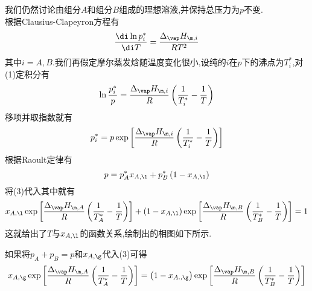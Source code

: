 \documentclass{ctexart}
\begin{document}
\begin{derivation}\setcounter{equation}{0}
    我们仍然讨论由组分$A$和组分$B$组成的理想溶液,并保持总压力为$p$不变.\\
    根据Clausius-Clapeyron方程有
    \begin{equation}
        \dfrac{\di\ln p_{i}^\ast}{\di T}=\dfrac{\Delta_\vap H_{\m,i}}{RT^2}
    \end{equation}
    其中$i=A,B$.我们再假定摩尔蒸发焓随温度变化很小,设纯的$i$在$p$下的沸点为$T_i^\ast$,对(1)定积分有
    \begin{equation}
        \ln\dfrac{p_i^\ast}{p}=\dfrac{\Delta_\vap H_{\m,i}}{R}\left(\dfrac{1}{T_i^\ast}-\dfrac1T\right)
    \end{equation}
    移项并取指数就有
    \begin{equation}
        p_i^\ast=p\exp{\left[\dfrac{\Delta_\vap H_{\m,i}}{R}\left(\dfrac{1}{T_i^\ast}-\dfrac1T\right)\right]}
    \end{equation}
    根据Raoult定律有
    \begin{equation}
        p=p_{A}^\ast x_{A,\l}+p_B^\ast\left(1-x_{A,\l}\right)
    \end{equation}
    将(3)代入其中就有
    \begin{equation}
        x_{A,\l}\exp{\left[\dfrac{\Delta_\vap H_{\m,A}}{R}\left(\dfrac{1}{T_A^\ast}-\dfrac1T\right)\right]}
        +\left(1-x_{A,\l}\right)\exp{\left[\dfrac{\Delta_\vap H_{\m,B}}{R}\left(\dfrac{1}{T_B^\ast}-\dfrac1T\right)\right]}=1
    \end{equation}
    这就给出了$T$与$x_{A,\l}$的函数关系,绘制出的相图如下所示.
    \begin{center}
        
    \end{center}
    如果将$p_A+p_B=p$和$x_{A,\g}$代入(3)可得
    \begin{equation}
        x_{A,\g}\exp{\left[\dfrac{\Delta_\vap H_{\m,A}}{R}\left(\dfrac{1}{T_A^\ast}-\dfrac1T\right)\right]}
        =\left(1-x_{A.,\g}\right)\exp{\left[\dfrac{\Delta_\vap H_{\m,B}}{R}\left(\dfrac{1}{T_B^\ast}-\dfrac1T\right)\right]}
    \end{equation}
\end{derivation}
\end{document}
